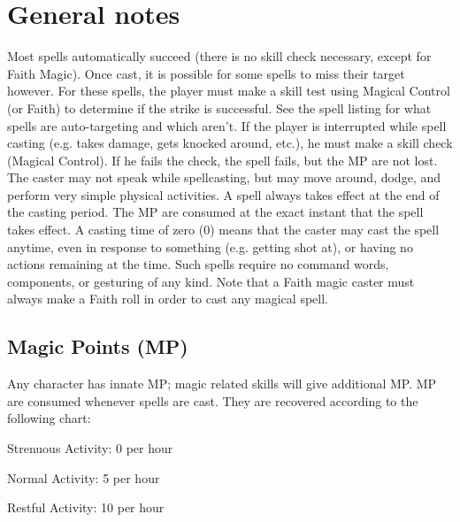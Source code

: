 \documentclass[twoside]{book}
\begin{document}
\section{General notes}
      Most spells automatically succeed (there is no skill
             check necessary, except for Faith Magic). Once cast, it is
             possible for some spells to miss their target however. For
             these spells, the player must make a skill test using
             Magical Control (or Faith) to determine if the strike is
             successful. See the spell listing for what spells are
             auto-targeting and which aren’t.   If the player is interrupted while spell casting (e.g.
            takes damage, gets knocked around, etc.), he must make a
            skill check (Magical Control). If he fails the check, the
            spell fails, but the MP are not lost.
               The caster may not speak while spellcasting, but may
               move around, dodge, and perform very simple physical
               activities. 
            A spell always takes effect at the end of the casting
             period. The MP are consumed at the exact instant that the
             spell takes effect.   A casting time of zero (0) means that the caster may
             cast the spell anytime, even in response to something (e.g.
             getting shot at), or having no actions remaining at the
             time. Such spells require no command words, components, or
             gesturing of any kind.   Note that a Faith magic caster must always make a
             Faith roll in order to cast any magical spell. 
\subsection{Magic Points (MP)}
      Any character has innate MP; magic related skills
               will give additional MP.   MP are consumed whenever spells are cast. They are
               recovered according to the following chart:   
                
                  
                    
                    
                  
                  
                   Strenuous Activity: 
                   0 per hour   
                  
                  
                   Normal Activity: 
                   5 per hour   
                  
                  
                   Restful Activity: 
                   10 per hour   
                  
\end{document}
